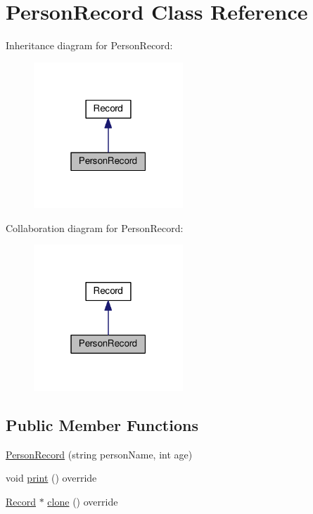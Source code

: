 \hypertarget{classPersonRecord}{}\section{Person\+Record Class Reference}
\label{classPersonRecord}


Inheritance diagram for Person\+Record\+:\nopagebreak
\begin{figure}[H]
\begin{center}
\leavevmode
\includegraphics[width=159pt]{classPersonRecord__inherit__graph}
\end{center}
\end{figure}


Collaboration diagram for Person\+Record\+:\nopagebreak
\begin{figure}[H]
\begin{center}
\leavevmode
\includegraphics[width=159pt]{classPersonRecord__coll__graph}
\end{center}
\end{figure}
\subsection*{Public Member Functions}
\begin{DoxyCompactItemize}
\item 
\hyperlink{classPersonRecord_a124548640e4d2075933e176f86d09e04}{Person\+Record} (string person\+Name, int age)
\item 
void \hyperlink{classPersonRecord_a5e4de1bb08b2d52adf778cda7aeb71ee}{print} () override
\item 
\hyperlink{classRecord}{Record} $\ast$ \hyperlink{classPersonRecord_a52c028d43ada61bb5b96c162569fbed3}{clone} () override
\end{DoxyCompactItemize}
